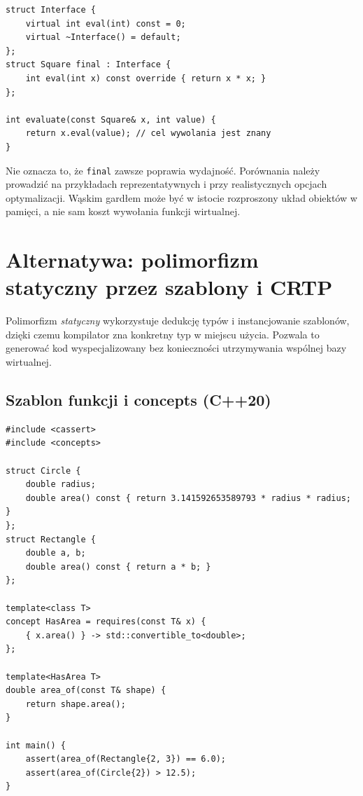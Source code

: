 \begin{lstlisting}[caption={final może ułatwiać ustalenie celu wywołania; fragment.}]
struct Interface {
    virtual int eval(int) const = 0;
    virtual ~Interface() = default;
};
struct Square final : Interface {
    int eval(int x) const override { return x * x; }
};

int evaluate(const Square& x, int value) {
    return x.eval(value); // cel wywolania jest znany
}
\end{lstlisting}

\noindent Nie oznacza to, że \texttt{final} zawsze poprawia wydajność.
Porównania należy prowadzić na przykładach reprezentatywnych
i przy realistycznych opcjach optymalizacji. Wąskim gardłem może
być w istocie rozproszony układ obiektów w pamięci, a nie sam
koszt wywołania funkcji wirtualnej.

\section{Alternatywa: polimorfizm statyczny przez szablony i CRTP}
\label{sec:cpp12-static-poly}

Polimorfizm \emph{statyczny} wykorzystuje dedukcję typów i
instancjowanie szablonów, dzięki czemu kompilator zna konkretny typ
w miejscu użycia. Pozwala to generować kod wyspecjalizowany
bez konieczności utrzymywania wspólnej bazy wirtualnej.

\subsection{Szablon funkcji i concepts (C++20)}

\begin{lstlisting}[caption={Polimorfizm statyczny przez concept (C++20); kompletny program.}]
#include <cassert>
#include <concepts>

struct Circle {
    double radius;
    double area() const { return 3.141592653589793 * radius * radius; }
};
struct Rectangle {
    double a, b;
    double area() const { return a * b; }
};

template<class T>
concept HasArea = requires(const T& x) {
    { x.area() } -> std::convertible_to<double>;
};

template<HasArea T>
double area_of(const T& shape) {
    return shape.area();
}

int main() {
    assert(area_of(Rectangle{2, 3}) == 6.0);
    assert(area_of(Circle{2}) > 12.5);
}
\end{lstlisting}

